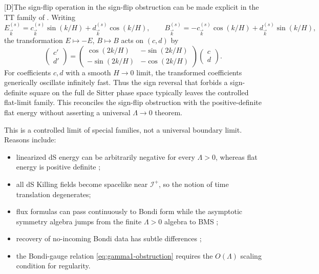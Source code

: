 \documentclass[11pt,a4paper]{article}
\newcommand{\scri}{\mathscr{I}}
\newcommand{\statusD}{\textsf{[D]}}
\begin{document}
\statusD The sign-flip operation in the sign-flip obstruction can be made explicit in the TT family of \cite{ashtekar2015linear}.  Writing
\begin{equation}
  E_{\vec k}^{(s)}=c_{\vec k}^{(s)}\sin(k/H)+d_{\vec k}^{(s)}\cos(k/H),
  \qquad
  B_{\vec k}^{(s)}=-c_{\vec k}^{(s)}\cos(k/H)+d_{\vec k}^{(s)}\sin(k/H),
\end{equation}
the transformation \(E\mapsto-E\), \(B\mapsto B\) acts on \((c,d)\) by
\begin{equation}\label{eq:sign-flip-flat}
  \begin{pmatrix}c'\\ d'\end{pmatrix}
  =
  \begin{pmatrix}
    \cos(2k/H) & -\sin(2k/H)\\
    -\sin(2k/H) & -\cos(2k/H)
  \end{pmatrix}
  \begin{pmatrix}c\\ d\end{pmatrix}.
\end{equation}
For coefficients \(c,d\) with a smooth \(H\to0\) limit, the transformed coefficients generically oscillate infinitely fast.  Thus the sign reversal that forbids a sign-definite square on the full de Sitter phase space typically leaves the controlled flat-limit family.  This reconciles the sign-flip obstruction with the positive-definite flat energy without asserting a universal \(\Lambda\to0\) theorem.

This is a controlled limit of special families, not a universal boundary limit.  Reasons include:
\begin{itemize}
  \item linearized dS energy can be arbitrarily negative for every \(\Lambda>0\), whereas flat energy is positive definite \cite{ashtekar2015linear};
  \item all dS Killing fields become spacelike near \(\scri^+\), so the notion of time translation degenerates;
  \item flux formulas can pass continuously to Bondi form while the asymptotic symmetry algebra jumps from the finite \(\Lambda>0\) algebra to BMS \cite{bonga2023radiation};
  \item recovery of no-incoming Bondi data has subtle differences \cite{ashtekar2019noincoming};
  \item the Bondi-gauge relation \eqref{eq:gamma1-obstruction} requires the \(O(\Lambda)\) scaling condition for regularity.
\end{itemize}
\end{document}
